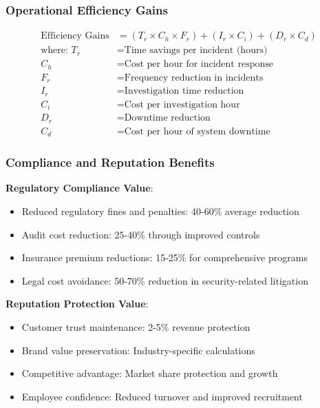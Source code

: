 \documentclass[11pt,a4paper]{article}
\begin{document}
\subsubsection{Operational Efficiency Gains}

\begin{align}
\text{Efficiency Gains} &= \left(T_r \times C_h \times F_r\right) + \left(I_r \times C_i\right) + \left(D_r \times C_d\right) \\
\text{where: } T_r &= \text{Time savings per incident (hours)} \\
C_h &= \text{Cost per hour for incident response} \\
F_r &= \text{Frequency reduction in incidents} \\
I_r &= \text{Investigation time reduction} \\
C_i &= \text{Cost per investigation hour} \\
D_r &= \text{Downtime reduction} \\
C_d &= \text{Cost per hour of system downtime}
\end{align}

\subsubsection{Compliance and Reputation Benefits}

\textbf{Regulatory Compliance Value}:
\begin{itemize}
\item Reduced regulatory fines and penalties: 40-60\% average reduction
\item Audit cost reduction: 25-40\% through improved controls
\item Insurance premium reductions: 15-25\% for comprehensive programs
\item Legal cost avoidance: 50-70\% reduction in security-related litigation
\end{itemize}

\textbf{Reputation Protection Value}:
\begin{itemize}
\item Customer trust maintenance: 2-5\% revenue protection
\item Brand value preservation: Industry-specific calculations
\item Competitive advantage: Market share protection and growth
\item Employee confidence: Reduced turnover and improved recruitment
\end{itemize}
\end{document}
